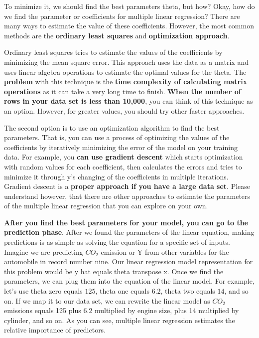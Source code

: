 	To minimize it, we should find the best parameters theta, but how? Okay, how do we find the parameter or coefficients for multiple linear regression? There are many ways to estimate the value of these coefficients. However, the most common methods are the \textbf{ordinary least squares} and \textbf{optimization approach}. 
	
	Ordinary least squares tries to estimate the values of the coefficients by minimizing the mean square error. This approach uses the data as a matrix and uses linear algebra operations to estimate the optimal values for the theta. The \textbf{problem} with this technique is the \textbf{time complexity of calculating matrix operations} as it can take a very long time to finish. \textbf{When the number of rows in your data set is less than 10,000}, you can think of this technique as an option. However, for greater values, you should try other faster approaches. 
	
	The second option is to use an optimization algorithm to find the best parameters. That is, you can use a process of optimizing the values of the coefficients by iteratively minimizing the error of the model on your training data. For example, you \textbf{can use gradient descent} which starts optimization with random values for each coefficient, then calculates the errors and tries to minimize it through y's changing of the coefficients in multiple iterations. Gradient descent is a \textbf{proper approach if you have a large data set}. Please understand however, that there are other approaches to estimate the parameters of the multiple linear regression that you can explore on your own. 
	
	\textbf{After you find the best parameters for your model, you can go to the prediction phase}. After we found the parameters of the linear equation, making predictions is as simple as solving the equation for a specific set of inputs. Imagine we are predicting $CO_2$ emission or Y from other variables for the automobile in record number nine. Our linear regression model representation for this problem would be y hat equals theta transpose x. Once we find the parameters, we can plug them into the equation of the linear model. For example, let's use theta zero equals $125$, theta one equals $6.2$, theta two equals $14$, and so on. If we map it to our data set, we can rewrite the linear model as $CO_2$ emissions equals 125 plus 6.2 multiplied by engine size, plus 14 multiplied by cylinder, and so on. As you can see, multiple linear regression estimates the relative importance of predictors. 
	
